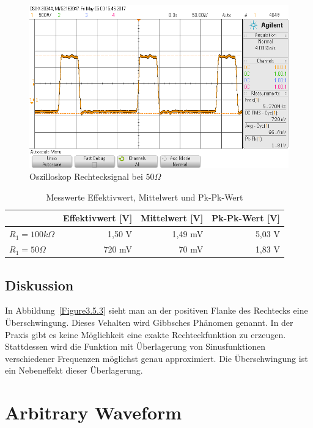 \documentclass[12pt,a4paper,titlepage]{article}
\begin{document}
\begin{figure}[H]
  \centering
  \includegraphics[width=14cm]{oszi_square_50.png}
  \caption{Oszilloskop Rechtecksignal bei $50 \Omega$}
  \label{Figure3.5.5}
\end{figure}

\begin{table}[H]
\centering
\begin{tabular}[t]{|l|r|r|r|}
\hline
           & Effektivwert {[}V{]} & Mittelwert {[}V{]} & Pk-Pk-Wert {[}V{]} \\ \hline
$R_1=100 k\Omega$ & 1,50 V               & 1,49 mV            & 5,03 V             \\ \hline
$R_1=50 \Omega$    & 720 mV               & 70 mV              & 1,83 V             \\ \hline
\end{tabular}
\caption{Messwerte Effektivwert, Mittelwert und Pk-Pk-Wert}
\label{Figure3.5.4}
\end{table}

\subsection{Diskussion}
In Abbildung~\ref{Figure3.5.3} sieht man an der positiven Flanke des Rechtecks eine \"Uberschwingung. Dieses Vehalten wird Gibbsches Ph\"anomen genannt. In der Praxis gibt es keine M\"oglichkeit eine exakte Rechteckfunktion zu erzeugen. Stattdessen wird die Funktion mit \"Uberlagerung von Sinusfunktionen verschiedener Frequenzen m\"oglichst genau approximiert. Die \"Uberschwingung ist ein Nebeneffekt dieser \"Uberlagerung. \\



\section{Arbitrary Waveform}
\end{document}
